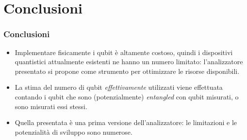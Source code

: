 \documentclass{beamer}
\begin{document}
\section{Conclusioni}
\begin{frame}
    \frametitle{Conclusioni}
    \begin{itemize}
        \item Implementare fisicamente i qubit è altamente costoso, quindi i dispositivi quantistici attualmente esistenti ne hanno un numero limitato: l'analizzatore presentato si propone come strumento per ottimizzare le risorse disponibili.
        \item La stima del numero di qubit \textit{effettivamente} utilizzati viene effettuata contando i qubit che sono (potenzialmente) \emph{entangled} con qubit misurati, o sono misurati essi stessi.
        \item Quella presentata è una prima versione dell'analizzatore: le limitazioni e le potenzialità di sviluppo sono numerose.
    \end{itemize}
\end{frame}


\end{document}
